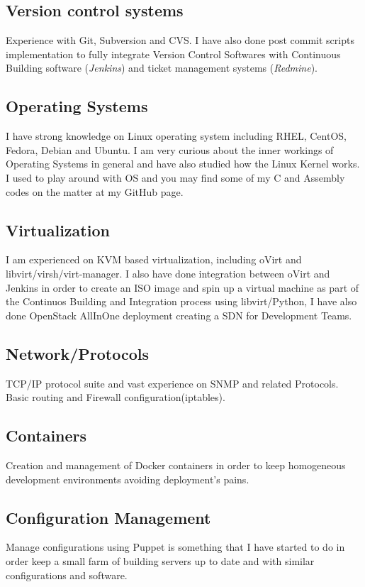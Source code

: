 \documentclass{article}
\begin{document}
\begin{multicols}{2}
\subsection{Version control systems}
Experience with Git, Subversion and CVS. I have also done post commit scripts
implementation to fully integrate Version Control Softwares with Continuous
Building software (\textit{Jenkins}) and ticket management systems 
(\textit{Redmine}). 

\subsection{Operating Systems}
I have strong knowledge on Linux operating system including RHEL, CentOS,
Fedora, Debian and Ubuntu. I am very curious about the inner workings of 
Operating Systems in general and have also studied how the Linux Kernel
works. I used to play around with OS and you may find some of my C and
Assembly codes on the matter at my GitHub page.

\subsection{Virtualization}
I am experienced on KVM based virtualization, including oVirt
and libvirt/virsh/virt-manager. I also have done integration between oVirt
and Jenkins in order to create an ISO image and spin up a virtual machine as part of 
the Continuos Building and Integration process using libvirt/Python, I have also 
done OpenStack AllInOne deployment creating a SDN for Development Teams.

\subsection{Network/Protocols}
TCP/IP protocol suite and vast experience on SNMP and related Protocols. Basic 
routing and Firewall configuration(iptables).

\subsection{Containers}
Creation and management of Docker containers in order to keep
homogeneous development environments avoiding deployment's pains.

\subsection{Configuration Management}
Manage configurations using Puppet is something that I have started to do
in order keep a small farm of building servers up to date and with similar
configurations and software.


\end{multicols}
\end{document}
